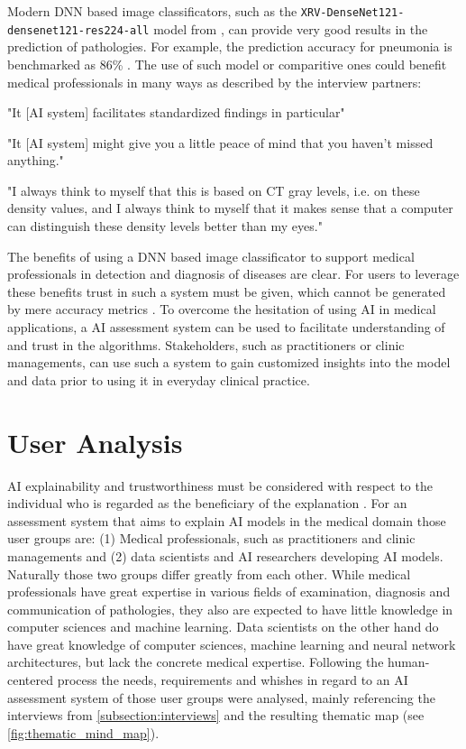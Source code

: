 \documentclass[11pt,a4paper,english]{scrreprt}
\begin{document}
Modern DNN based image classificators, such as the \texttt{XRV\--DenseNet121\--densenet121\--res224\--all} model from \textcite{cohen_limits_2020}, can provide very good results in the prediction of pathologies. For example, the prediction accuracy for pneumonia is benchmarked as 86\% \parencite{torchxrayvision_github}. The use of such model or comparitive ones could benefit medical professionals in many ways as described by the interview partners:
\begin{displayquote}
    "It [AI system] facilitates standardized findings in particular"
\end{displayquote}
\begin{displayquote}
    "It [AI system] might give you a little peace of mind that you haven't missed anything."
\end{displayquote}
\begin{displayquote}
    "I always think to myself that this is based on CT gray levels, i.e. on these density values, and I always think to myself that it makes sense that a computer can distinguish these density levels better than my eyes."
\end{displayquote}

The benefits of using a DNN based image classificator to support medical professionals in detection and diagnosis of diseases are clear. For users to leverage these benefits trust in such a system must be given, which cannot be generated by mere accuracy metrics \parencite{samek_explaining_2021}. To overcome the hesitation of using AI in medical applications, a AI assessment system can be used to facilitate understanding of and trust in the algorithms. Stakeholders, such as practitioners or clinic managements, can use such a system to gain customized insights into the model and data prior to using it in everyday clinical practice.

\section{User Analysis}\label{section:user_analysis}
AI explainability and trustworthiness must be considered with respect to the individual who is regarded as the beneficiary of the explanation \parencite{mueller_explanation_2019}. For an assessment system that aims to explain AI models in the medical domain those user groups are: (1) Medical professionals, such as practitioners and clinic managements and (2) data scientists and AI researchers developing AI models. Naturally those two groups differ greatly from each other. While medical professionals have great expertise in various fields of examination, diagnosis and communication of pathologies, they also are expected to have little knowledge in computer sciences and machine learning. Data scientists on the other hand do have great knowledge of computer sciences, machine learning and neural network architectures, but lack the concrete medical expertise. Following the human-centered process the needs, requirements and whishes in regard to an AI assessment system of those user groups were analysed, mainly referencing the interviews from \autoref{subsection:interviews} and the resulting thematic map (see \autoref{fig:thematic_mind_map}).
\end{document}
